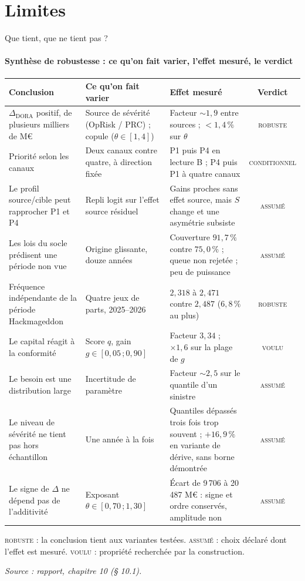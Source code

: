 \documentclass[aspectratio=169,10pt,t]{beamer}
\newcommand{\source}[1]{\par\vfill{\tiny\color{gris}\textit{Source : #1}}\par\vspace{-1mm}}
\renewcommand{\arraystretch}{1.25}
\begin{document}
\section{Limites}
\begin{frame}{Que tient, que ne tient pas ?}
  \suivimethode{}{}
  \framesubtitle{\ajout Synthèse de robustesse : ce qu'on fait varier, l'effet mesuré, le verdict}
  \scriptsize
  \renewcommand{\arraystretch}{1.0}
  \begin{tabularx}{\linewidth}{@{}>{\raggedright\arraybackslash}p{.27\linewidth} Y Y c@{}}
    \toprule
    Conclusion & Ce qu'on fait varier & Effet mesuré & Verdict \\
    \midrule
    $\Delta_{\mathrm{DORA}}$ positif, de plusieurs milliers de M€ & Source de sévérité (OpRisk / PRC) ; copule ($\theta\in[1,4]$) & Facteur $\sim1{,}9$ entre sources ; $<1{,}4\,\%$ sur $\theta$ & \textsc{robuste} \\
    Priorité selon les canaux & Deux canaux contre quatre, à direction fixée & P1 puis P4 en lecture B ; P4 puis P1 à quatre canaux & \textsc{conditionnel} \\
    Le profil source/cible peut rapprocher P1 et P4 & Repli logit sur l'effet source résiduel & Gains proches sans effet source, mais $S$ change et une asymétrie subsiste & \textsc{assumé} \\
    Les lois du socle prédisent une période non vue & Origine glissante, douze années & Couverture $91{,}7\,\%$ contre $75{,}0\,\%$ ; queue non rejetée ; peu de puissance & \textsc{assumé} \\
    Fréquence indépendante de la période Hackmageddon & Quatre jeux de parts, 2025--2026 & $2{,}318$ à $2{,}471$ contre $2{,}487$ ($6{,}8\,\%$ au plus) & \textsc{robuste} \\
    Le capital réagit à la conformité & Score $q$, gain $g\in[0{,}05\,;0{,}90]$ & Facteur $3{,}34$ ; $\times1{,}6$ sur la plage de $g$ & \textsc{voulu} \\
    Le besoin est une distribution large & Incertitude de paramètre & Facteur $\sim2{,}5$ sur le quantile d'un sinistre & \textsc{assumé} \\
    Le niveau de sévérité ne tient pas hors échantillon & Une année à la fois & Quantiles dépassés trois fois trop souvent ; $+16{,}9\,\%$ en variante de dérive, sans borne démontrée & \textsc{assumé} \\
    Le signe de $\Delta$ ne dépend pas de l'additivité & Exposant $\theta\in[0{,}70\,;1{,}30]$ & Écart de 9\,706 à 20\,487 M€ : signe et ordre conservés, amplitude non & \textsc{assumé} \\
    \bottomrule
  \end{tabularx}
  \vspace{1mm}
  {\tiny\color{gris}\textsc{robuste} : la conclusion tient aux variantes testées. \textsc{assumé} : choix déclaré dont l'effet est mesuré. \textsc{voulu} : propriété recherchée par la construction.\par}
  \source{rapport, chapitre 10 (§ 10.1).}
\end{frame}
\end{document}
